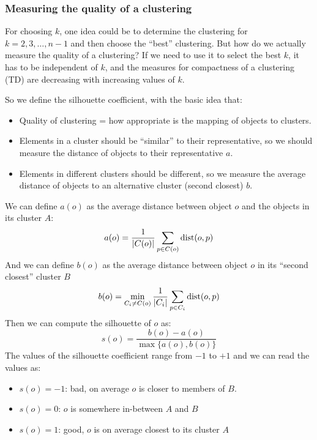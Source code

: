    \subsubsection{Measuring the quality of a clustering}
    For choosing $k$, one idea could be to determine the clustering for 
    $k=2,3,\dots,n-1$ and then choose the ``best'' clustering. But how do we 
    actually measure the quality of a clustering? If we need to use it to 
    select the best $k$, it has to be independent of $k$, and the measures for 
    compactness of a clustering (TD) are decreasing with increasing values of 
    $k$.
    
    So we define the silhouette coefficient, with the basic idea that:
    \begin{itemize}
        \item Quality of clustering = how appropriate is the mapping of objects 
        to clusters.
        \item Elements in a cluster should be ``similar'' to their 
        representative, so we should measure the distance of objects to their 
        representative $a$.
        \item Elements in different clusters should be different, so we measure 
        the average distance of objects to an alternative cluster (second 
        closest) $b$.
    \end{itemize}
    We can define $a(o)$ as the average distance between object $o$ and the 
    objects in its cluster $A$:
    \begin{equation*}
        a(o)=\frac{1}{|C(o)|} \sum_{p\in C(o)} \text{dist}(o,p)
    \end{equation*}
    And we can define $b(o)$ as the average distance between object $o$ in its 
    ``second closest'' cluster $B$
    \begin{equation*}
        b(o)=\min_{C_i \neq C(o)} \frac{1}{|C_i|} \sum_{p\in C_i} \text{dist}(o,p)
    \end{equation*}
    Then we can compute the silhouette of $o$ as:
    \begin{equation*}
        s(o)=\frac{b(o)-a(o)}{\max\{a(o),b(o)\}}
    \end{equation*}
    The values of the silhouette coefficient range from $-1$ to $+1$ and we can 
    read the values as:
    \begin{itemize}
        \item $s(o)=-1$: bad, on average $o$ is closer to members of $B$.
        \item $s(o)=0$: $o$ is somewhere in-between $A$ and $B$
        \item $s(o)=1$: good, $o$ is on average closest to its cluster $A$
    \end{itemize}
